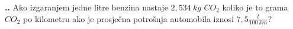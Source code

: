 
\noindent 
\textbf{
\thecjelina.\thezadatak.}
Ako izgaranjem jedne litre benzina nastaje $2,534\ kg$ $CO_2$ koliko je to grama $CO_2$ po kilometru ako je prosječna potrošnja automobila  iznosi $7,5\frac{l}{100\ km}$?
